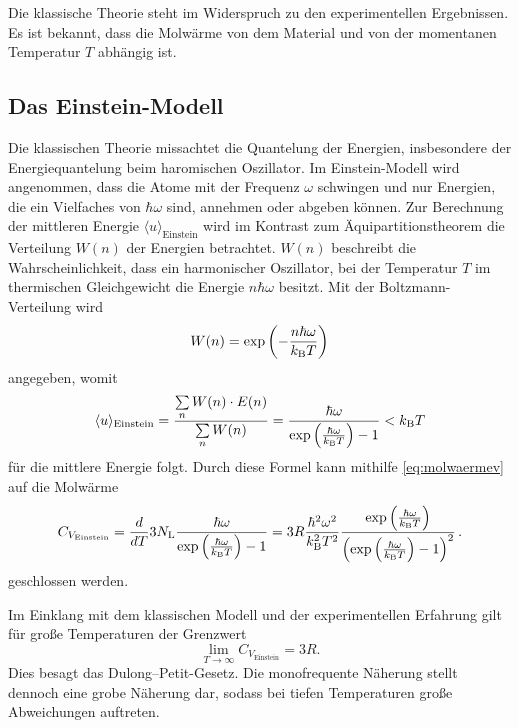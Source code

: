 Die klassische Theorie steht im Widerspruch zu den experimentellen Ergebnissen.
Es ist bekannt, 
dass die Molwärme von dem Material und von der momentanen Temperatur $T$ abhängig ist.


\subsection{Das Einstein-Modell}
Die klassischen Theorie missachtet die Quantelung der Energien, insbesondere der Energiequantelung beim haromischen Oszillator. 
Im Einstein-Modell wird angenommen, 
dass die Atome mit der Frequenz $\omega$ schwingen und  nur Energien, die ein Vielfaches von $\hbar\omega$ sind, annehmen oder abgeben können.
Zur Berechnung der mittleren Energie $\langle u \rangle _\text{Einstein}$ wird im Kontrast zum Äquipartitionstheorem die Verteilung $W(n)$ der Energien betrachtet. 
$W(n)$ beschreibt die Wahrscheinlichkeit, 
dass ein harmonischer Oszillator, 
bei der Temperatur $T$ im thermischen Gleichgewicht die Energie $n\hbar\omega$ besitzt.
Mit der Boltzmann-Verteilung wird
\begin{equation*}
	W(n) = \exp{\left(-\frac{n\hbar \omega}{k_\text B T}\right)}
\end{equation*}
angegeben, womit 
\begin{equation*}
	\langle u \rangle _\text{Einstein} = \frac{\sum\limits_n W(n)\cdot E(n)}{\sum\limits_n W(n)}=	\frac{\hbar\omega}{\exp{\left(\frac{\hbar\omega}{k_\text B T}\right)} - 1}  < k_\text B T
\end{equation*}
für die mittlere Energie folgt.
Durch diese Formel kann mithilfe \eqref{eq:molwaermev} auf die Molwärme
\begin{equation}
	C_{V_\text{Einstein}} = \frac{d}{dT}3 N_\text L \frac{\hbar\omega}{\exp{\left(\frac{\hbar\omega}{k_\text B T}\right)} - 1} = 3R \frac{\hbar^2\omega^2}{k_\text B ^2 T^2} \frac{\exp{\left(\frac{\hbar\omega}{k_\text B T}\right)}}{\left(\exp{\left(\frac{\hbar\omega}{k_\text B T}\right)}-1\right)^2}\,\text.
	\label{eqn:cv}
\end{equation}
geschlossen werden.

Im Einklang mit dem klassischen Modell und der experimentellen Erfahrung gilt für große Temperaturen der Grenzwert
\begin{equation}
	\lim_{T\to\infty} C_{V_\text{Einstein}} = 3R.
\end{equation}
Dies besagt das Dulong--Petit-Gesetz.
Die monofrequente Näherung stellt dennoch eine grobe Näherung dar, 
sodass bei tiefen Temperaturen große Abweichungen auftreten.

